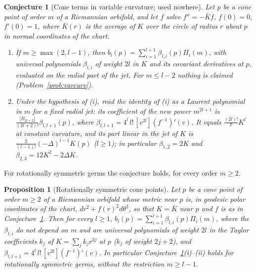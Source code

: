 \documentclass[pdflatex,sn-mathphys-num]{sn-jnl}
\theoremstyle{thmstyleone}%
\newtheorem{proposition}[theorem]{Proposition}%
\newtheorem{conjecture}[theorem]{Conjecture}%
\theoremstyle{thmstylethree}%
\begin{document}
\begin{conjecture}[Cone terms in variable curvature; used nowhere]\label{conj:varcone}
Let $p$ be a cone point of order $m$ of a Riemannian orbifold, and let $f$ solve $f''=-\bar Kf$, $f(0)=0$, $f'(0)=1$, where $\bar K(r)$ is the average of $K$ over the circle of radius $r$ about $p$ in normal coordinates of the chart.
\begin{enumerate}[label=(\roman*)]
\item If $m\ge\max(2,l-1)$, then $b_l(p)=\sum_{i=1}^{l+1}\beta_{l,i}(p)\Pi_i(m)$, with universal polynomials $\beta_{l,i}$ of weight $2l$ in $K$ and its covariant derivatives at $p$, evaluated on the radial part of the jet. For $m\le l-2$ nothing is claimed (Problem~\ref{prob:varcurv}).
\item Under the hypothesis of (i), read the identity of (i) as a Laurent polynomial in $m$ for a fixed radial jet: its coefficient of the new power $m^{2l+1}$ is $\frac{|B_{2l+2}|}{(2l+2)!}\beta_{l,l+1}(p)$, where $\beta_{l,l+1}=4^l\,l!\,[v^{2l}](f^{-1})'(v)$. It equals $\frac{(2l)!}{l!}K^l$ at constant curvature, and its part linear in the jet of $K$ is $\frac{2}{(l-1)!}(-\Delta)^{l-1}K(p)$ ($l\ge1$); in particular $\beta_{1,2}=2K$ and $\beta_{2,3}=12K^2-2\Delta K$.
\end{enumerate}
\end{conjecture}

For rotationally symmetric germs the conjecture holds, for every order $m\ge2$.

\begin{proposition}[Rotationally symmetric cone points]\label{prop:varconerot}
Let $p$ be a cone point of order $m\ge2$ of a Riemannian orbifold whose metric near $p$ is, in geodesic polar coordinates of the chart, $dr^2+f(r)^2d\theta^2$, so that $K=\bar K$ near $p$ and $f$ is as in Conjecture~\ref{conj:varcone}. Then for every $l\ge1$, $b_l(p)=\sum_{i=1}^{l+1}\beta_{l,i}(p)\Pi_i(m)$, where the $\beta_{l,i}$ do not depend on $m$ and are universal polynomials of weight $2l$ in the Taylor coefficients $k_j$ of $K=\sum_jk_jr^{2j}$ at $p$ ($k_j$ of weight $2j+2$), and $\beta_{l,l+1}=4^l\,l!\,[v^{2l}](f^{-1})'(v)$. In particular Conjecture~\ref{conj:varcone}(i)--(ii) holds for rotationally symmetric germs, without the restriction $m\ge l-1$.
\end{proposition}
\end{document}
